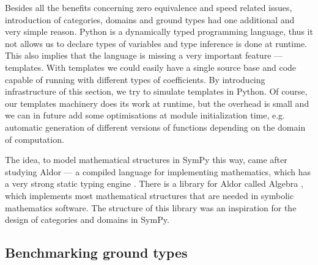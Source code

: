 Besides all the benefits concerning zero equivalence and speed related issues, introduction of categories,
domains and ground types had one additional and very simple reason. Python is a dynamically typed programming
language, thus it not allows us to declare types of variables and type inference is done at runtime. This also
implies that the language is missing a very important feature --- templates. With templates we could easily
have a single source base and code capable of running with different types of coefficients. By introducing
infrastructure of this section, we try to simulate templates in Python. Of course, our templates machinery
does its work at runtime, but the overhead is small and we can in future add some optimisations at module
initialization time, e.g. automatic generation of different versions of functions depending on the domain
of computation.

The idea, to model mathematical structures in SymPy this way, came after studying Aldor --- a compiled
language for implementing mathematics, which has a very strong static typing engine \cite{Aldor2000guide}.
There is a library for Aldor called Algebra \cite{Bronstein2004algebra}, which implements most mathematical
structures that are needed in symbolic mathematics software. The structure of this library was an
inspiration for the design of categories and domains in SymPy.


\subsection{Benchmarking ground types}

